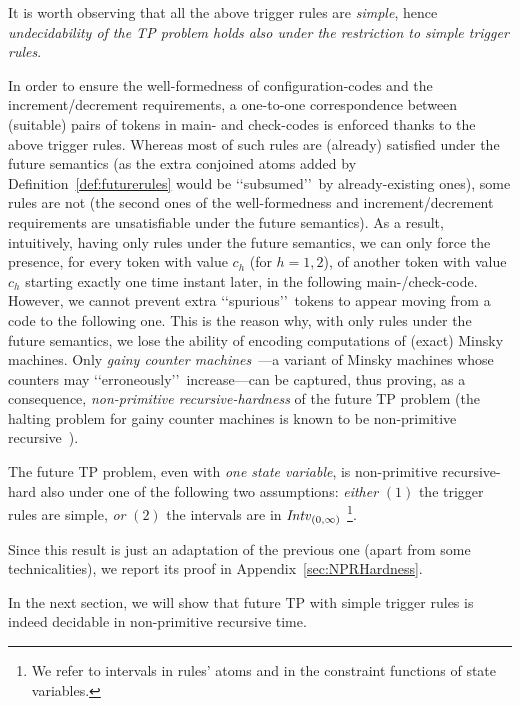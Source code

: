 It is worth observing that all the above trigger rules are \emph{simple}, hence \emph{undecidability of the TP problem holds also under the restriction to simple trigger rules}.

In order to ensure the well-formedness of configuration-codes and the increment/decrement requirements, a one-to-one correspondence between (suitable) pairs of tokens in main- and check-codes is enforced thanks to the above trigger rules. Whereas most of such rules are (already) satisfied under the future semantics (as the extra conjoined atoms added by Definition~\ref{def:futurerules} would be \lq\lq subsumed\rq\rq\ by already-existing ones), some rules are not (the second ones of the well-formedness and increment/decrement requirements are unsatisfiable under the future semantics). 
As a result, intuitively, having only rules under the future semantics,
we can only force the presence, for every token with value $c_h$ (for $h=1,2$), of another token with value $c_h$ starting exactly one time instant later, in the following main-/check-code. However, we cannot prevent extra \lq\lq spurious\rq\rq\  tokens to appear moving from a code to the following one.
This is the reason why, with only rules under the future semantics, we lose the ability of encoding computations of (exact) Minsky machines. Only \emph{gainy counter machines}~\cite{DemriL09}---a variant of Minsky machines whose counters may \lq\lq erroneously\rq\rq\ increase---can be captured, thus proving, as a consequence, 
\emph{non-primitive recursive-hardness} of the future TP problem (the halting problem for gainy counter machines is known to be non-primitive recursive~\cite{DemriL09}). 

\begin{theorem}\label{theorem:NPRHardness}
The future TP problem, even with \emph{one state variable}, is non-primitive recursive-hard also under one of the following two assumptions: \emph{either} $(1)$ the trigger rules are simple,
\emph{or} $(2)$ the intervals are in ${\mathit{Intv}}_{(0,\infty)}$%
\footnote{We refer to intervals in rules' atoms and in the constraint functions of state variables.}.
\end{theorem}

Since this result is just an adaptation of the previous one (apart from some technicalities), we report its proof in Appendix~\ref{sec:NPRHardness}. 

In the next section, we will show that future TP with simple trigger rules is indeed decidable in non-primitive recursive time. 